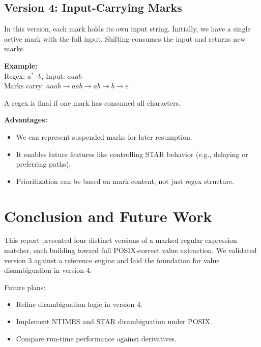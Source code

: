 \documentclass[11pt]{article}
\begin{document}
\subsection*{Version 4: Input-Carrying Marks}

In this version, each mark holds its own input string. Initially, we have a single active mark with the full input. Shifting consumes the input and returns new marks.

\textbf{Example:}\\
Regex: $a^* \cdot b$, Input: $aaab$\\
Marks carry: $aaab \to aab \to ab \to b \to \varepsilon$

A regex is final if one mark has consumed all characters.

\textbf{Advantages:}
\begin{itemize}
    \item We can represent suspended marks for later resumption.
    \item It enables future features like controlling STAR behavior (e.g., delaying or preferring paths).
    \item Prioritization can be based on mark content, not just regex structure.
\end{itemize}

\section{Conclusion and Future Work}

This report presented four distinct versions of a marked regular expression matcher, each building toward full POSIX-correct value extraction. We validated version 3 against a reference engine and laid the foundation for value disambiguation in version 4.

Future plans:
\begin{itemize}
    \item Refine disambiguation logic in version 4.
    \item Implement NTIMES and STAR disambiguation under POSIX.
    \item Compare run-time performance against derivatives.
\end{itemize}



\end{document}
